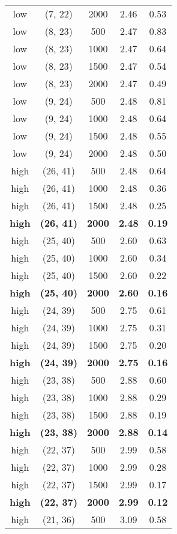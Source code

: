 \begin{tabular}{c c c c c}
low & (7, 22) &  2000 & 2.46 & 0.53 \\
low & (8, 23) &  500 & 2.47 & 0.83 \\
low & (8, 23) &  1000 & 2.47 & 0.64 \\
low & (8, 23) &  1500 & 2.47 & 0.54 \\
low & (8, 23) &  2000 & 2.47 & 0.49 \\
low & (9, 24) &  500 & 2.48 & 0.81 \\
low & (9, 24) &  1000 & 2.48 & 0.64 \\
low & (9, 24) &  1500 & 2.48 & 0.55 \\
low & (9, 24) &  2000 & 2.48 & 0.50 \\
high & (26, 41) &  500 & 2.48 & 0.64 \\
high & (26, 41) &  1000 & 2.48 & 0.36 \\
high & (26, 41) &  1500 & 2.48 & 0.25 \\
\textbf{high} & \textbf{(26, 41)} & \textbf{ 2000} & \textbf{2.48} & \textbf{0.19} \\
high & (25, 40) &  500 & 2.60 & 0.63 \\
high & (25, 40) &  1000 & 2.60 & 0.34 \\
high & (25, 40) &  1500 & 2.60 & 0.22 \\
\textbf{high} & \textbf{(25, 40)} & \textbf{ 2000} & \textbf{2.60} & \textbf{0.16} \\
high & (24, 39) &  500 & 2.75 & 0.61 \\
high & (24, 39) &  1000 & 2.75 & 0.31 \\
high & (24, 39) &  1500 & 2.75 & 0.20 \\
\textbf{high} & \textbf{(24, 39)} & \textbf{ 2000} & \textbf{2.75} & \textbf{0.16} \\
high & (23, 38) &  500 & 2.88 & 0.60 \\
high & (23, 38) &  1000 & 2.88 & 0.29 \\
high & (23, 38) &  1500 & 2.88 & 0.19 \\
\textbf{high} & \textbf{(23, 38)} & \textbf{ 2000} & \textbf{2.88} & \textbf{0.14} \\
high & (22, 37) &  500 & 2.99 & 0.58 \\
high & (22, 37) &  1000 & 2.99 & 0.28 \\
high & (22, 37) &  1500 & 2.99 & 0.17 \\
\textbf{high} & \textbf{(22, 37)} & \textbf{ 2000} & \textbf{2.99} & \textbf{0.12} \\
high & (21, 36) &  500 & 3.09 & 0.58 \\

\end{tabular}
